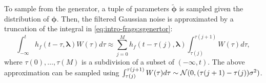 To sample from the generator, a tuple of parameters $\tilde{\boldsymbol{\phi}}$ is sampled given the distribution of $\boldsymbol{\phi}$. Then, the filtered Gaussian noise is approximated by a truncation of the integral in \cref{eq:intro-frags:sgenertor}:
    \begin{equation}
        \int_{-\infty}^t h_f(t-\tau,\boldsymbol\lambda)W(\tau)d\tau \approx \sum_{j=0}^{M}h_f(t- \tau(j),\boldsymbol{\lambda} ) \int_{\tau(j)}^{\tau(j+1)}W(\tau)d\tau, %
    \end{equation}
where $\tau(0),\dots,\tau(M)$ is a subdivision of a subset of $(-\infty,t)$.
The above approximation can be sampled using $\int_{\tau(j)}^{\tau(j+1)}W(\tau)d\tau\sim\mathcal{N}(0,(\tau(j+1)-\tau(j))\sigma^2)$.







